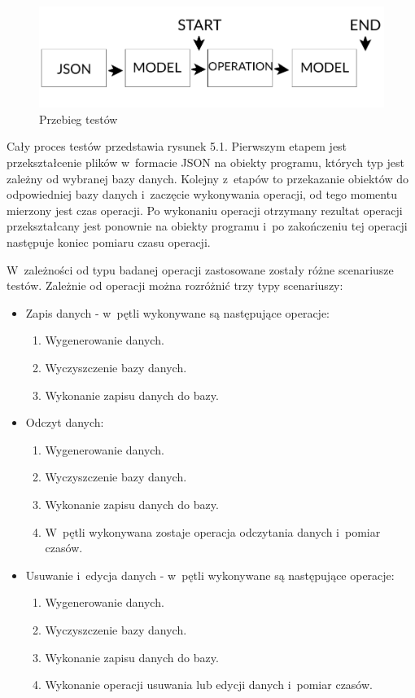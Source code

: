 \begin{figure}[h]
\centering
	\includegraphics[width=\linewidth]{img/database/operation-scheme.png}
	\caption{Przebieg testów}
	\label{fig: operation_scheme}
\end{figure}

Cały proces testów przedstawia rysunek 5.1.  Pierwszym etapem jest przekształcenie plików w~formacie JSON na obiekty programu, których typ jest zależny od wybranej bazy danych. Kolejny z~etapów to przekazanie obiektów do odpowiedniej bazy danych i~zaczęcie wykonywania operacji, od tego momentu mierzony jest czas operacji. Po wykonaniu operacji otrzymany rezultat operacji przekształcany jest ponownie na obiekty programu i~po zakończeniu tej operacji następuje koniec pomiaru czasu operacji. 

 W~zależności od typu badanej operacji zastosowane zostały różne scenariusze testów. Zależnie od operacji można rozróżnić trzy typy scenariuszy: 

\begin{itemize}
	 \item Zapis danych - w~pętli wykonywane są następujące operacje:
	 
	 \begin{enumerate}
	 \item Wygenerowanie danych.
	 \item Wyczyszczenie bazy danych.
	 \item Wykonanie zapisu danych do bazy.
	 \end{enumerate}
	 
	 \item Odczyt danych:
	 
	  \begin{enumerate}
	 \item Wygenerowanie danych.
	 \item Wyczyszczenie bazy danych.
	 \item Wykonanie zapisu danych do bazy.
	 \item W~pętli wykonywana zostaje operacja odczytania danych i~pomiar czasów.
	 \end{enumerate}
	 
	 \item Usuwanie i~edycja danych - w~pętli wykonywane są następujące operacje:
	 
	 \begin{enumerate}
	 \item Wygenerowanie danych.
	 \item Wyczyszczenie bazy danych.
	 \item Wykonanie zapisu danych do bazy.
	 \item Wykonanie operacji usuwania lub edycji danych i~pomiar czasów.
	 \end{enumerate}
	 
\end{itemize}

